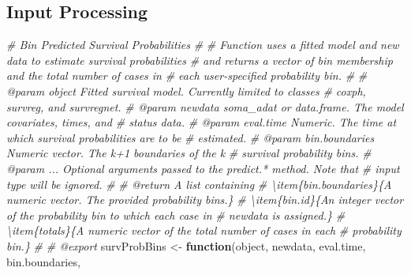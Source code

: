\documentclass[
]{book}
\newenvironment{Shaded}{\begin{snugshade}}{\end{snugshade}}
\newcommand{\CommentTok}[1]{\textcolor[rgb]{0.56,0.35,0.01}{\textit{#1}}}
\newcommand{\ControlFlowTok}[1]{\textcolor[rgb]{0.13,0.29,0.53}{\textbf{#1}}}
\newcommand{\NormalTok}[1]{#1}
\newcommand{\OtherTok}[1]{\textcolor[rgb]{0.56,0.35,0.01}{#1}}
\begin{document}
\hypertarget{input-processing-2}{%
\subsection{Input Processing}\label{input-processing-2}}

\begin{Shaded}
\begin{Highlighting}[]
\CommentTok{\#\textquotesingle{} Bin Predicted Survival Probabilities}
\CommentTok{\#\textquotesingle{} }
\CommentTok{\#\textquotesingle{} Function uses a fitted model and new data to estimate survival probabilities}
\CommentTok{\#\textquotesingle{}   and returns a vector of bin membership and the total number of cases in}
\CommentTok{\#\textquotesingle{}   each user{-}specified probability bin.}
\CommentTok{\#\textquotesingle{}   }
\CommentTok{\#\textquotesingle{} @param object Fitted survival model. Currently limited to classes}
\CommentTok{\#\textquotesingle{}   \textasciigrave{}coxph\textasciigrave{}, \textasciigrave{}survreg\textasciigrave{}, and \textasciigrave{}survregnet\textasciigrave{}.}
\CommentTok{\#\textquotesingle{} @param newdata soma\_adat or data.frame. The model covariates, times, and}
\CommentTok{\#\textquotesingle{}   status data.}
\CommentTok{\#\textquotesingle{} @param eval.time Numeric. The time at which survival probabilities are to be}
\CommentTok{\#\textquotesingle{}   estimated.}
\CommentTok{\#\textquotesingle{} @param bin.boundaries Numeric vector. The k+1 boundaries of the k}
\CommentTok{\#\textquotesingle{}   survival probability bins.}
\CommentTok{\#\textquotesingle{} @param ... Optional arguments passed to the \textasciigrave{}predict.*\textasciigrave{} method. Note that}
\CommentTok{\#\textquotesingle{}   input \textasciigrave{}type\textasciigrave{} will be ignored.}
\CommentTok{\#\textquotesingle{} }
\CommentTok{\#\textquotesingle{} @return A list containing}
\CommentTok{\#\textquotesingle{} \textbackslash{}item\{bin.boundaries\}\{A numeric vector. The provided probability bins.\}}
\CommentTok{\#\textquotesingle{} \textbackslash{}item\{bin.id\}\{An integer vector of the probability bin to which each case in }
\CommentTok{\#\textquotesingle{}   \textasciigrave{}newdata\textasciigrave{} is assigned.\}}
\CommentTok{\#\textquotesingle{} \textbackslash{}item\{totals\}\{A numeric vector of the total number of cases in each }
\CommentTok{\#\textquotesingle{}   probability bin.\}}
\CommentTok{\#\textquotesingle{} }
\CommentTok{\#\textquotesingle{} @export}
\NormalTok{survProbBins }\OtherTok{\textless{}{-}} \ControlFlowTok{function}\NormalTok{(object, newdata, eval.time, bin.boundaries, }

\end{Highlighting}
\end{Shaded}
\end{document}

